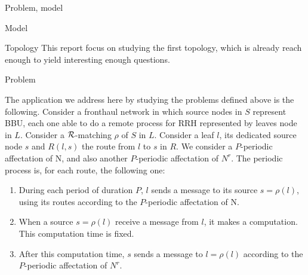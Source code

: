 \documentclass[a4paper,10pt]{report}
\begin{document}
\begin{chapter}{Problem, model}
\begin{section}{Model}
\begin{subsection}{Topology}
This report focus on studying the first topology, which is already reach enough to yield interesting enough questions.

\end{subsection}

\end{section}
\begin{section}{Problem}
   
The application we address here by studying the problems defined above is the following. Consider a fronthaul network in which source nodes in $S$ represent BBU,
each one able to do a remote process for RRH represented by leaves node in $L$. Consider a ${\cal R}$-matching $\rho$ of $S$ in $L$. Consider a leaf $l$, its dedicated source node $s$
and $R(l,s)$ the route from $l$ to $s$ in $R$. We consider a $P$-periodic affectation of N, and also another $P$-periodic affectation of $N^{r}$.
The periodic process is, for each route, the following one:
\begin{enumerate}
 \item During each period of duration $P$, $l$ sends a message to its source $s=\rho(l)$, using its routes according to the $P$-periodic affectation of N. 
 \item When a source $s=\rho(l)$ receive a message from $l$, it makes a computation. This computation time is fixed.
 \item After this computation time, $s$ sends a message to $l=\rho(l)$ according to the $P$-periodic affectation of $N^{r}$.
\end{enumerate}

\end{section}
\end{chapter}
\end{document}
